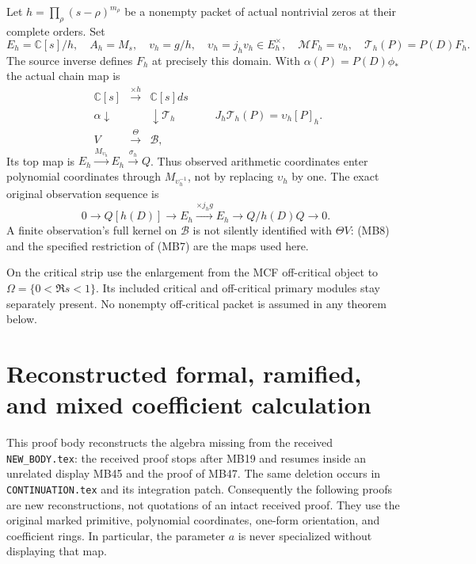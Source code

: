 \documentclass[11pt,a4paper]{article}
\theoremstyle{definition}
\begin{document}
Let $h=\prod_\rho(s-\rho)^{m_\rho}$ be a nonempty packet of actual
nontrivial zeros at their complete orders.  Set
\begin{equation}
 E_h=\mathbb C[s]/h,\quad A_h=M_s,\quad v_h=g/h,\quad
 \upsilon_h=j_hv_h\in E_h^\times,\quad
 \mathcal MF_h=v_h,\quad \mathcal T_h(P)=P(D)F_h.         \tag{MB6}
\end{equation}
The source inverse defines $F_h$ at precisely this domain.  With
$\alpha(P)=P(D)\phi_*$ the actual chain map is
\begin{equation}
\begin{array}{ccc}
\mathbb C[s]&\xrightarrow{\times h}&\mathbb C[s]ds\\
\alpha\downarrow&&\downarrow\mathcal T_h\\
V&\xrightarrow{\Theta}&\mathscr B,
\end{array}
\qquad
J_h\mathcal T_h(P)=\upsilon_h[P]_h.                    \tag{MB7}
\end{equation}
Its top map is $E_h\xrightarrow{M_{\upsilon_h}}E_h
\xrightarrow{\sigma_h}Q$.  Thus observed arithmetic coordinates enter
polynomial coordinates through $M_{\upsilon_h^{-1}}$, not by replacing
$\upsilon_h$ by one. The exact original observation sequence is
\begin{equation}
0\to Q[h(D)]\to E_h\xrightarrow{\times j_hg}E_h
                  \to Q/h(D)Q\to0.                    \tag{MB8}
\end{equation}
A finite observation's full kernel on $\mathscr B$ is not silently
identified with $\Theta V$: (MB8) and the specified restriction of (MB7)
are the maps used here.

On the critical strip use the enlargement from the MCF off-critical
object to $\Omega=\{0<\Re s<1\}$. Its included critical and off-critical
primary modules stay separately present. No nonempty off-critical packet
is assumed in any theorem below.




\section{Reconstructed formal, ramified, and mixed coefficient calculation}
\label{sec:intake-algebra}

This proof body reconstructs the algebra missing from the received
\texttt{NEW\_BODY.tex}: the received proof stops after MB19 and resumes
inside an unrelated display MB45 and the proof of MB47.  The same deletion
occurs in \texttt{CONTINUATION.tex} and its integration patch.  Consequently
the following proofs are new reconstructions, not quotations of an intact
received proof.  They use the original marked primitive, polynomial
coordinates, one-form orientation, and coefficient rings.  In particular,
the parameter $a$ is never specialized without displaying that map.
\end{document}
